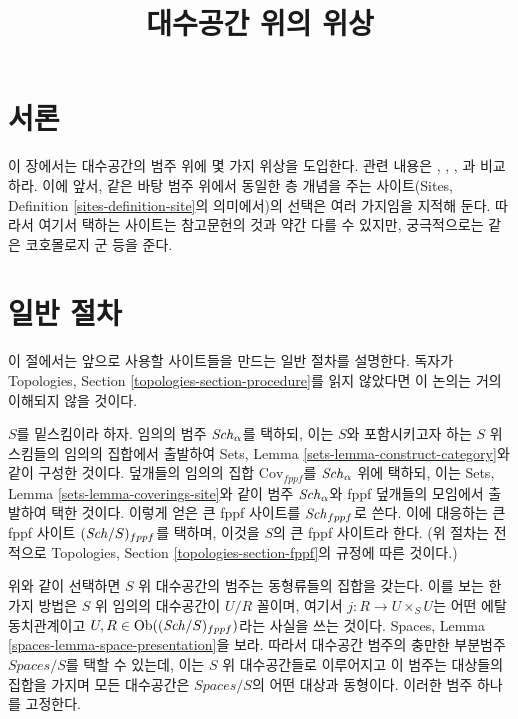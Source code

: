 

%


\title{대수공간 위의 위상}

\maketitle

\label{section-phantom}

\tableofcontents




\section{서론}
\label{section-introduction}

\noindent
이 장에서는 대수공간의 범주 위에 몇 가지 위상을 도입한다. 관련 내용은
\cite{SGA1}, \cite{Ner}, \cite{LM-B}, \cite{Kn}과 비교하라.
이에 앞서, 같은 바탕 범주 위에서 동일한 층 개념을 주는 사이트(Sites,
Definition \ref{sites-definition-site}의 의미에서)의 선택은 여러 가지임을
지적해 둔다. 따라서 여기서 택하는 사이트는 참고문헌의 것과 약간 다를
수 있지만, 궁극적으로는 같은 코호몰로지 군 등을 준다.




\section{일반 절차}
\label{section-procedure}

\noindent
이 절에서는 앞으로 사용할 사이트들을 만드는 일반 절차를 설명한다.
독자가 Topologies, Section \ref{topologies-section-procedure}를 읽지
않았다면 이 논의는 거의 이해되지 않을 것이다.

\medskip\noindent
$S$를 밑스킴이라 하자. 임의의 범주 $\mathit{Sch}_\alpha$를 택하되, 이는
$S$와 포함시키고자 하는 $S$ 위 스킴들의 임의의 집합에서 출발하여
Sets, Lemma \ref{sets-lemma-construct-category}와 같이 구성한 것이다.
덮개들의 임의의 집합 $\text{Cov}_{fppf}$를 $\mathit{Sch}_\alpha$ 위에 택하되,
이는 Sets, Lemma \ref{sets-lemma-coverings-site}와 같이 범주
$\mathit{Sch}_\alpha$와 fppf 덮개들의 모임에서 출발하여 택한 것이다. 이렇게
얻은 큰 fppf 사이트를 $\mathit{Sch}_{fppf}$로 쓴다. 이에 대응하는 큰 fppf
사이트 $(\mathit{Sch}/S)_{fppf}$를 택하며, 이것을 $S$의 큰 fppf 사이트라 한다.
(위 절차는 전적으로 Topologies, Section
\ref{topologies-section-fppf}의 규정에 따른 것이다.)

\medskip\noindent
위와 같이 선택하면 $S$ 위 대수공간의 범주는 동형류들의 집합을 갖는다.
이를 보는 한 가지 방법은 $S$ 위 임의의 대수공간이 $U/R$ 꼴이며, 여기서
$j : R \to U \times_S U$는 어떤 에탈 동치관계이고
$U, R \in \mathop{\mathrm{Ob}}\nolimits((\mathit{Sch}/S)_{fppf})$라는 사실을 쓰는 것이다. Spaces, Lemma
\ref{spaces-lemma-space-presentation}을 보라. 따라서 대수공간 범주의 충만한
부분범주 $\textit{Spaces}/S$를 택할 수 있는데, 이는 $S$ 위 대수공간들로
이루어지고 이 범주는
대상들의 집합을 가지며 모든 대수공간은 $\textit{Spaces}/S$의 어떤
대상과 동형이다. 이러한 범주 하나를 고정한다.

